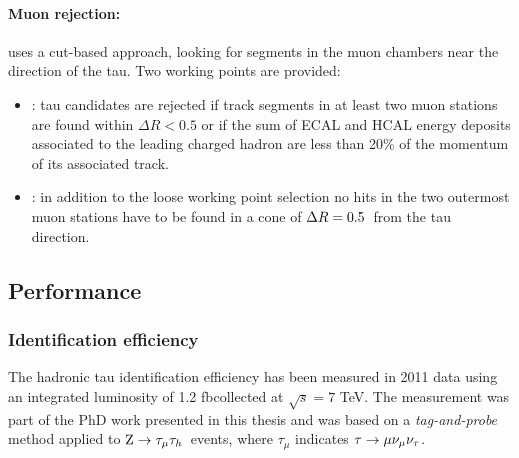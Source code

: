\paragraph{Muon rejection:} uses a cut-based approach, looking for segments in the muon chambers near the direction of %
the tau. Two working points are provided:

\begin{itemize}
\item {}: tau candidates are rejected if track segments in at least two muon stations are found within $\Delta R < 0.5$ or if the sum of ECAL and HCAL energy deposits associated to the leading charged hadron are less than 20\% of the momentum of its associated track.
\item {}: in addition to the loose working point selection no hits in the two outermost muon stations have to be found in a cone of $\Delta R = 0.5$\ from the tau direction.
\end{itemize}

\subsection{Performance}

\subsubsection{Identification efficiency}
\label{sec:tauid_eff}
The hadronic tau identification efficiency has been measured in 2011 data using an integrated luminosity of 1.2 fb\Inv collected at $\sqrt{s}=7$ TeV. 
The measurement was part of the PhD work presented in this thesis and was based on a \emph{tag-and-probe} method applied to $\mathrm{Z}\rightarrow\tau_\mu\tau_h$\ events, where $\tau_\mu$ indicates $\tau\rightarrow\mu\nu_\mu\nu_\tau$. 

